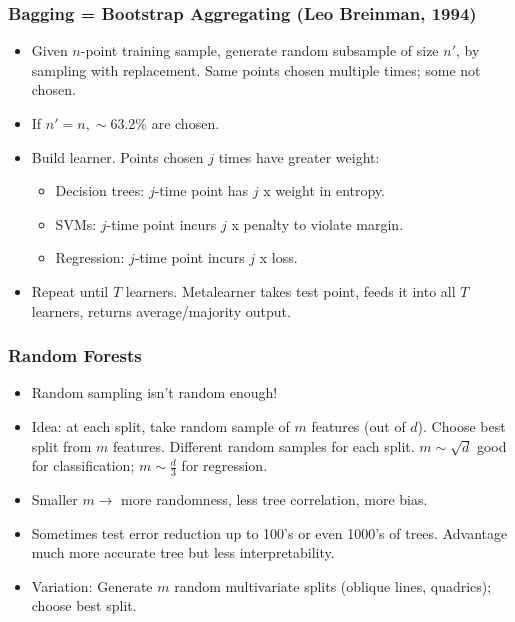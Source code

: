 \documentclass[10pt]{article}
\begin{document}
\subsubsection*{Bagging = Bootstrap Aggregating (Leo Breinman, 1994)}
\begin{itemize}
	\item Given $n$-point training sample, generate random subsample of size $n'$, by sampling with replacement. Same points chosen multiple times; some not chosen.
	\item If $n' = n, \sim 63.2\%$ are chosen.
	\item Build learner. Points chosen $j$ times have greater weight:
		\begin{itemize}
			\item Decision trees: $j$-time point has $j$ x weight in entropy.
			\item SVMs: $j$-time point incurs $j$ x penalty to violate margin.
			\item Regression: $j$-time point incurs $j$ x loss.
		\end{itemize}
	\item Repeat until $T$ learners. Metalearner takes test point, feeds it into all $T$ learners, returns average/majority output.
\end{itemize}

\subsubsection*{Random Forests}
\begin{itemize}
	\item Random sampling isn't random enough!
	\item Idea: at each split, take random sample of $m$ features (out of $d$). Choose best split from $m$ features. Different random samples for each split. $m \sim \sqrt{d}$ good for classification; $m \sim \frac{d}{3}$ for regression.
	\item Smaller $m \rightarrow$ more randomness, less tree correlation, more bias.
	\item Sometimes test error reduction up to 100's or even 1000's of trees. Advantage much more accurate tree but less interpretability.
	\item Variation: Generate $m$ random multivariate splits (oblique lines, quadrics); choose best split.
\end{itemize}
\end{document}
